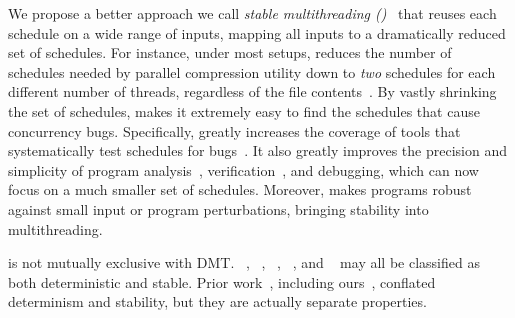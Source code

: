 We propose a better approach we call \emph{stable multithreading
  (\smt)}~\cite{smt:cacm,smt:hotpar13} that reuses each schedule on a wide
range of inputs, mapping all inputs to a dramatically reduced set of
schedules.  For instance, under most setups, \smt reduces the number of
schedules needed by parallel compression utility \pbzip down to \emph{two}
schedules for each different number of threads, regardless of the file
contents~\cite{peregrine:sosp11}.  By vastly shrinking the set of schedules, \smt makes it
extremely easy to find the schedules that cause concurrency bugs.  Specifically,
\smt greatly increases the coverage of tools that
systematically test schedules for
bugs~\cite{musuvathi:chess:osdi08,modist:nsdi09,godefroid:verisoft,dbug:spin11}.
It also greatly improves the precision and simplicity of program
analysis~\cite{wu:pldi12}, verification~\cite{wu:pldi12}, and debugging,
which can now focus on a much smaller set of schedules.  Moreover, \smt
makes programs robust against small input or program perturbations,
bringing stability into multithreading.

\smt is not mutually exclusive with DMT.  \grace~\cite{grace:oopsla09},
\tern~\cite{cui:tern:osdi10}, \determinator~\cite{determinator:osdi10},
\peregrine~\cite{peregrine:sosp11}, and \dthreads~\cite{dthreads:sosp11}
may all be classified as both deterministic and stable. Prior
work~\cite{dthreads:sosp11,cui:tern:osdi10,peregrine:sosp11,determinator:osdi10},
including ours~\cite{cui:tern:osdi10,peregrine:sosp11}, conflated
determinism and stability, but they are actually separate properties.


